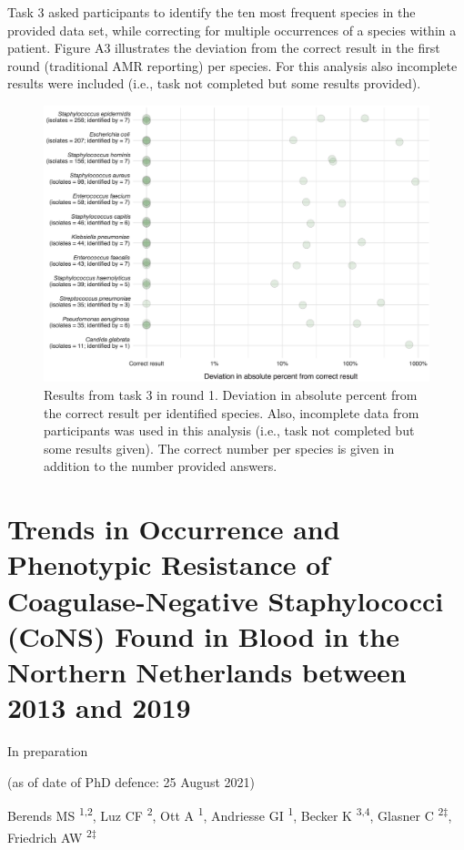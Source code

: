 \documentclass[
]{book}
\begin{document}
Task 3 asked participants to identify the ten most frequent species in the provided data set, while correcting for multiple occurrences of a species within a patient. Figure A3 illustrates the deviation from the correct result in the first round (traditional AMR reporting) per species. For this analysis also incomplete results were included (i.e., task not completed but some results provided).

\begin{figure}

{\centering \includegraphics[width=1\linewidth]{images/06-a03} 

}

\caption{Results from task 3 in round 1. Deviation in absolute percent from the correct result per identified species. Also, incomplete data from participants was used in this analysis (i.e., task not completed but some results given). The correct number per species is given in addition to the number provided answers.}\label{fig:fig6-a1}
\end{figure}

\hypertarget{ch07-cons}{%
\chapter{Trends in Occurrence and Phenotypic Resistance of Coagulase-Negative Staphylococci (CoNS) Found in Blood in the Northern Netherlands between 2013 and 2019}\label{ch07-cons}}

In preparation

(as of date of PhD defence: 25 August 2021)

Berends MS \textsuperscript{1,2}, Luz CF \textsuperscript{2}, Ott A \textsuperscript{1}, Andriesse GI \textsuperscript{1}, Becker K \textsuperscript{3,4}, Glasner C \textsuperscript{2‡}, Friedrich AW \textsuperscript{2‡}
\end{document}
